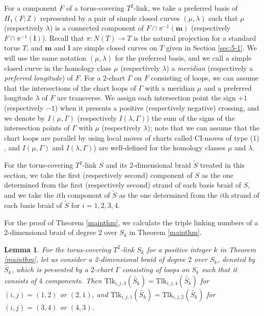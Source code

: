 \documentclass[a4paper,11pt]{amsart}
\numberwithin{equation}{section}
\newtheorem{lemma}[theorem]{Lemma}
\begin{document}
For a component $F$ of a torus-covering $T^2$-link, we take a preferred basis of $H_1(F; \mathbb{Z})$ represented by a pair of simple closed curves $(\mu, \lambda)$ such that $\mu$ (respectively $\lambda$) is a connected component of $F \cap \pi^{-1}(\mathbf{m})$ (respectively $F \cap \pi^{-1}(\mathbf{l})$). Recall that $\pi: N(T) \to T$ is the natural projection for a standard torus $T$, and $\mathbf{m}$ and $\mathbf{l}$ are simple closed curves on $T$ given in Section \ref{sec:5-1}. We will use the same notation $(\mu, \lambda)$ for the preferred basis, and we call a simple closed curve in the homology class $\mu$ (respectively $\lambda$) a {\it meridian} (respectively a {\it preferred longitude}) of $F$. 
For a $2$-chart $\Gamma$ on $F$ consisting of loops, we can assume that 
the intersections of the chart loops of $\Gamma$ with a meridian $\mu$ and a preferred longitude $\lambda$ of $F$ are transverse. We assign each intersection point the sign $+1$ (respectively $-1$) when it presents a positive (respectively negative) crossing, and we denote by $I(\mu, \Gamma)$ (respectively $I(\lambda, \Gamma)$) the sum of the signs of the intersection points of $\Gamma$ with $\mu$ (respectively $\lambda$); note that we can assume that the chart loops are parallel by using local moves of charts called CI-moves of type (1) \cite{Kamada02}, and $I(\mu, \Gamma)$ and $I(\lambda, \Gamma)$) are well-defined for the homology classes $\mu$ and $\lambda$. 


For the torus-covering $T^2$-link $S$ and its 2-dimensional braid $\widetilde{S}$ treated in this section, we take the first (respectively second) component of $S$ as the one determined from the first (respectively second) strand of each basis braid of $S$, and we take the $i$th component of $\widetilde{S}$ as the one determined from the $i$th strand of each basis braid of $\widetilde{S}$ for $i=1,2,3,4$. 

For the proof of Theorem \ref{mainthm}, we calculate the triple linking numbers of a 2-dimensional braid of degree $2$ over $S_k$ in Theorem \ref{mainthm}.  

\begin{lemma}\label{lemma2}
For the torus-covering $T^2$-link $S_k$ for a positive integer $k$ in Theorem \ref{mainthm}, let us consider a 2-dimensional braid of degree $2$ over $S_k$, denoted by $\widetilde{S_k}$, which is presented by a $2$-chart $\Gamma$ consisting of loops on $S_k$ such that it consists of $4$ components. 
Then $\mathrm{Tlk}_{i,j,3}(\widetilde{S_k})=\mathrm{Tlk}_{i,j,4}(\widetilde{S_k})$ for $(i,j)=(1,2)$ or $(2,1)$, and 
$\mathrm{Tlk}_{i,j,1}(\widetilde{S_k})=\mathrm{Tlk}_{i,j,2}(\widetilde{S_k})$ for $(i,j)=(3,4)$ or $(4,3)$. 
\end{lemma}
\end{document}
